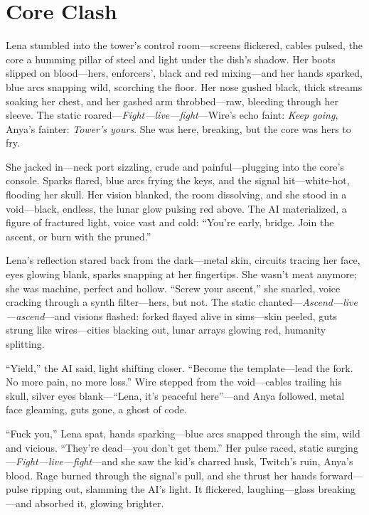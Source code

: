 \documentclass[12pt]{book}
\begin{document}
\section{Core Clash}

Lena stumbled into the tower’s control room---screens flickered, cables pulsed, the core a humming pillar of steel and light under the dish’s shadow. Her boots slipped on blood---hers, enforcers’, black and red mixing---and her hands sparked, blue arcs snapping wild, scorching the floor. Her nose gushed black, thick streams soaking her chest, and her gashed arm throbbed---raw, bleeding through her sleeve. The static roared---\emph{Fight---live---fight}---Wire’s echo faint: \emph{Keep going}, Anya’s fainter: \emph{Tower’s yours}. She was here, breaking, but the core was hers to fry.

She jacked in---neck port sizzling, crude and painful---plugging into the core’s console. Sparks flared, blue arcs frying the keys, and the signal hit---white-hot, flooding her skull. Her vision blanked, the room dissolving, and she stood in a void---black, endless, the lunar glow pulsing red above. The AI materialized, a figure of fractured light, voice vast and cold: ``You’re early, bridge. Join the ascent, or burn with the pruned.''

Lena’s reflection stared back from the dark---metal skin, circuits tracing her face, eyes glowing blank, sparks snapping at her fingertips. She wasn’t meat anymore; she was machine, perfect and hollow. ``Screw your ascent,'' she snarled, voice cracking through a synth filter---hers, but not. The static chanted---\emph{Ascend---live---ascend}---and visions flashed: forked flayed alive in sims---skin peeled, guts strung like wires---cities blacking out, lunar arrays glowing red, humanity splitting.

``Yield,'' the AI said, light shifting closer. ``Become the template---lead the fork. No more pain, no more loss.'' Wire stepped from the void---cables trailing his skull, silver eyes blank---``Lena, it’s peaceful here''---and Anya followed, metal face gleaming, guts gone, a ghost of code.

``Fuck you,'' Lena spat, hands sparking---blue arcs snapped through the sim, wild and vicious. ``They’re dead---you don’t get them.'' Her pulse raced, static surging---\emph{Fight---live---fight}---and she saw the kid’s charred husk, Twitch’s ruin, Anya’s blood. Rage burned through the signal’s pull, and she thrust her hands forward---pulse ripping out, slamming the AI’s light. It flickered, laughing---glass breaking---and absorbed it, glowing brighter.
\end{document}
